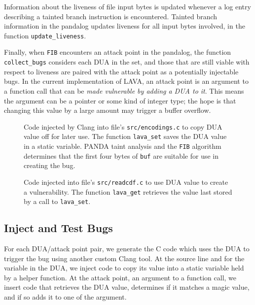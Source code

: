 Information about the liveness of file input bytes is updated whenever a log entry describing a tainted branch instruction is encountered.
Tainted branch information in the pandalog updates liveness for all input bytes involved, in the function \verb+update_liveness+.

Finally, when \verb+FIB+ encounters an attack point in the pandalog, the function \verb+collect_bugs+ considers each DUA in the set,
and those that are still viable with respect to liveness are paired with the attack point as a potentially injectable bugs.
In the current implementation of LAVA, an attack point is an argument to a function call that can be \emph{made vulnerable by adding a DUA to it}.
This means the argument can be a pointer or some kind of integer type; the hope is that changing this value by a large amount may trigger a buffer overflow.

\begin{figure}

\caption{Code injected by Clang into file's \texttt{src/encodings.c} to copy DUA value off for later use.
The function \texttt{lava\_set} saves the DUA value in a static variable.
PANDA taint analysis and the \texttt{FIB} algorithm determines that the first four bytes of \texttt{buf} are suitable for use in creating the bug.}
\label{src:dua-siphon}
\end{figure}

\begin{figure}

\caption{Code injected into file's \texttt{src/readcdf.c} to use DUA value to create a vulnerability.
The function \texttt{lava\_get} retrieves the value last stored by a call to  \texttt{lava\_set}.}
\label{src:dua-use}
\end{figure}

\subsection{Inject and Test Bugs}
For each DUA/attack point pair, we generate the C code which uses the DUA to trigger the bug using another custom Clang tool.
At the source line and for the variable in the DUA, we inject code to copy its value into a static variable held by a helper function.
At the attack point, an argument to a function call, we insert code that retrieves the DUA value, determines if it matches a magic value, and if so adds it to one of the argument.

